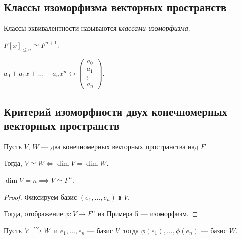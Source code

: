 \subsection{Классы изоморфизма векторных пространств}

\begin{definition}
    Классы эквивалентности называются \textit{классами изоморфизма}.   
\end{definition}

\begin{example}
    $F[x]_{\leq n} \simeq F^{n + 1}$:

    $a_0 + a_1 x + \dots + a_n x^n \longleftrightarrow \begin{pmatrix} a_0 \\ a_1 \\ \vdots \\ a_n \end{pmatrix}$.
\end{example}


\subsection{Критерий изоморфности двух конечномерных векторных пространств}

\begin{theorem}
    Пусть $V$, $W$ --- два конечномерных векторных пространства над $F$.

    Тогда, $V \simeq W \iff \dim V = \dim W$.
\end{theorem}

\begin{lemma}
    \label{lec16:lemma_1}
    $\dim V = n \implies V \simeq F^n$.
\end{lemma}

\begin{proof}
    Фиксируем базис $(e_1, \dots, e_n)$ в $V$.

    Тогда, отображение $\phi : V \to F^n$ из \hyperref[lec16:example_5]{Примера 5} --- изоморфизм.
\end{proof}

\begin{lemma}
    \label{lec16:lemma_2}
    Пусть $V \MapsTo W$ и $e_1, \dots, e_n$ --- базис $V$, тогда $\phi(e_1), \dots, \phi(e_n)$ --- базис $W$. 
\end{lemma}

